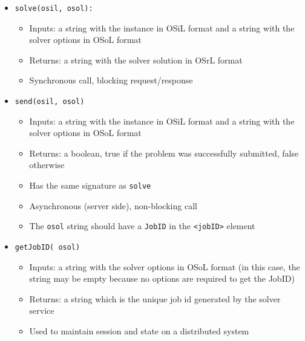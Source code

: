 \documentclass[11pt]{article}
\renewcommand{\_}{{\char"5F}}
\renewcommand{\{}{{\char"7B}}
\renewcommand{\}}{{\char"7D}}
\renewcommand{\^}{{\char"0D}}
\renewcommand{\'}{{\char"0D}}
\begin{document}
\begin{itemize}
\item {\tt solve(osil, osol):}

\begin{itemize}

\item Inputs: a string with the instance in OSiL format and a string with the solver options in OSoL format

\item  Returns: a string with the solver solution in OSrL format

\item  Synchronous call, blocking request/response

\end{itemize}



\item {\tt send(osil, osol)}


\begin{itemize}

\item Inputs: a string with the instance in OSiL format and a string with the solver options in OSoL format

\item Returns:  a boolean, true if the problem was successfully submitted, false otherwise

\item Has the same signature as {\tt solve}

\item  Asynchronous (server side), non-blocking call

\item The {\tt osol} string should have a {\tt JobID} in the {\tt <jobID>} element
\end{itemize}

\item {\tt getJobID( osol)}

\begin{itemize}

\item Inputs: a string  with the solver options in OSoL format (in this case, the string may be empty because no options are required to get the JobID)

\item  Returns: a string which is the unique job id generated by the solver service

\item  Used to maintain session and state on a distributed system
\end{itemize}




\end{itemize}
\end{document}
